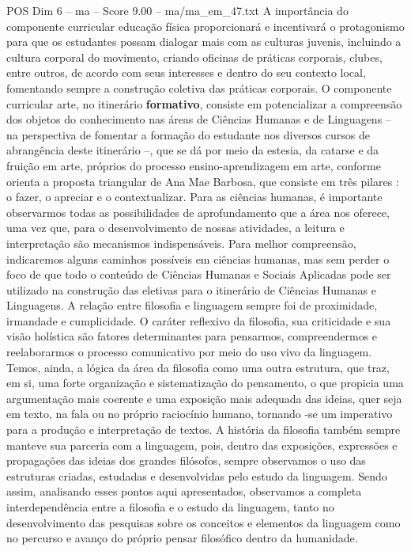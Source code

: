 \begin{textsample}{POS Dim 6 – ma – Score 9.00 – ma/ma\_em\_47.txt}
A importância do componente curricular educação física proporcionará e incentivará o protagonismo para que os estudantes possam dialogar mais com as culturas juvenis, incluindo a cultura corporal do movimento, criando oficinas de práticas corporais, clubes, entre outros, de acordo com seus interesses e dentro do seu contexto local, fomentando sempre a construção coletiva das práticas corporais.
O componente curricular arte, no itinerário \textbf{formativo}, consiste em potencializar a compreensão dos objetos do conhecimento nas áreas de Ciências Humanas e de Linguagens – na perspectiva de fomentar a formação do estudante nos diversos cursos de abrangência deste itinerário –, que se dá por meio da estesia, da catarse e da fruição em arte, próprios do processo ensino-aprendizagem em arte, conforme orienta a proposta triangular de Ana Mae Barbosa, que consiste em três pilares : o fazer, o apreciar e o contextualizar.
Para as ciências humanas, é importante observarmos todas as possibilidades de aprofundamento que a área nos oferece, uma vez que, para o desenvolvimento de nossas atividades, a leitura e interpretação são mecanismos indispensáveis.
Para melhor compreensão, indicaremos alguns caminhos possíveis em ciências humanas, mas sem perder o foco de que todo o conteúdo de Ciências Humanas e Sociais Aplicadas pode ser utilizado na construção das eletivas para o itinerário de Ciências Humanas e Linguagens.
A relação entre filosofia e linguagem sempre foi de proximidade, irmandade e cumplicidade.
O caráter reflexivo da filosofia, sua criticidade e sua visão holística são fatores determinantes para pensarmos, compreendermos e reelaborarmos o processo comunicativo por meio do uso vivo da linguagem.
Temos, ainda, a lógica da área da filosofia como uma outra estrutura, que traz, em si, uma forte organização e sistematização do pensamento, o que propicia uma argumentação mais coerente e uma exposição mais adequada das ideias, quer seja em texto, na fala ou no próprio raciocínio humano, tornando -se um imperativo para a produção e interpretação de textos.
A história da filosofia também sempre manteve sua parceria com a linguagem, pois, dentro das exposições, expressões e propagações das ideias dos grandes filósofos, sempre observamos o uso das estruturas criadas, estudadas e desenvolvidas pelo estudo da linguagem.
Sendo assim, analisando esses pontos aqui apresentados, observamos a completa interdependência entre a filosofia e o estudo da linguagem, tanto no desenvolvimento das pesquisas sobre os conceitos e elementos da linguagem como no percurso e avanço do próprio pensar filosófico dentro da humanidade.

\end{textsample}
